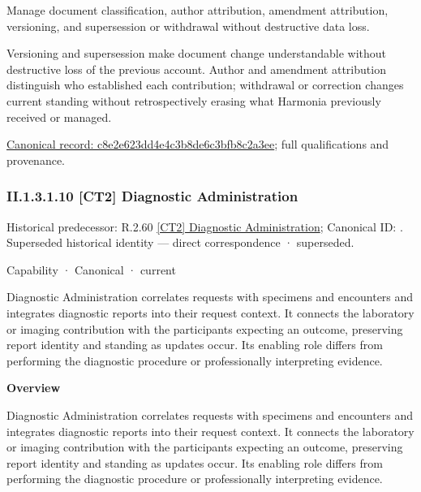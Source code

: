 Manage document classification, author attribution, amendment attribution, versioning, and supersession or withdrawal without destructive data loss.



Versioning and supersession make document change understandable without destructive loss of the previous account. Author and amendment attribution distinguish who established each contribution; withdrawal or correction changes current standing without retrospectively erasing what Harmonia previously received or managed.


{\footnotesize \href{../../../../../../../continuum/strategy/capability/feature/c8e2e623dd4e4c3b8de6c3bfb8c2a3ee.md}{Canonical record: c8e2e623dd4e4c3b8de6c3bfb8c2a3ee}; full qualifications and provenance.}\par
\subsubsection*{II.1.3.1.10 [CT2] Diagnostic Administration}
\label{navigation:II.1.3.1.10}

{\small Historical predecessor: R.2.60 \hyperref[element:2b1a27d5d9944e05b4cf0fcaad4ca433]{[CT2] Diagnostic Administration}; Canonical ID: \texttt{}. Superseded historical identity — direct correspondence · superseded.}\par
\label{element:3cc720ba2e8b4d7a94bb349391d61895}
{\small Capability · Canonical · current}\par

Diagnostic Administration correlates requests with specimens and encounters and integrates diagnostic reports into their request context. It connects the laboratory or imaging contribution with the participants expecting an outcome, preserving report identity and standing as updates occur. Its enabling role differs from performing the diagnostic procedure or professionally interpreting evidence.



\textbf{Overview}



Diagnostic Administration correlates requests with specimens and encounters and integrates diagnostic reports into their request context. It connects the laboratory or imaging contribution with the participants expecting an outcome, preserving report identity and standing as updates occur. Its enabling role differs from performing the diagnostic procedure or professionally interpreting evidence.



